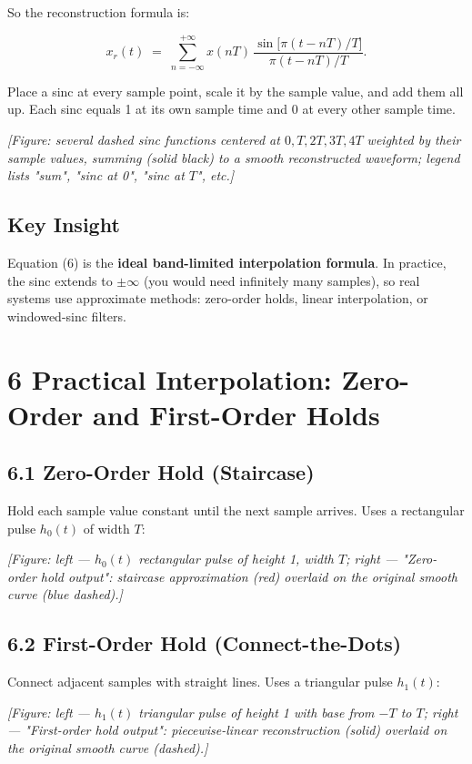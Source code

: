 \documentclass[11pt]{article}
\begin{document}
So the reconstruction formula is:

\[\boxed{\,x_r(t) \;=\; \sum_{n=-\infty}^{+\infty} x(nT)\,\frac{\sin\!\big[\pi(t-nT)/T\big]}{\pi(t-nT)/T}.\,} \tag{6}\]

Place a sinc at every sample point, scale it by the sample value, and add them all up. Each sinc equals 1 at its own sample time and 0 at every other sample time.

\textit{[Figure: several dashed sinc functions centered at $0, T, 2T, 3T, 4T$ weighted by their sample values, summing (solid black) to a smooth reconstructed waveform; legend lists "sum", "sinc at 0", "sinc at $T$", etc.]}

\subsection*{Key Insight}

Equation (6) is the \textbf{ideal band-limited interpolation formula}. In practice, the sinc extends to $\pm\infty$ (you would need infinitely many samples), so real systems use approximate methods: zero-order holds, linear interpolation, or windowed-sinc filters.

\section*{6 Practical Interpolation: Zero-Order and First-Order Holds}

\subsection*{6.1 Zero-Order Hold (Staircase)}

Hold each sample value constant until the next sample arrives. Uses a rectangular pulse $h_0(t)$ of width $T$:

\textit{[Figure: left — $h_0(t)$ rectangular pulse of height 1, width $T$; right — "Zero-order hold output": staircase approximation (red) overlaid on the original smooth curve (blue dashed).]}

\subsection*{6.2 First-Order Hold (Connect-the-Dots)}

Connect adjacent samples with straight lines. Uses a triangular pulse $h_1(t)$:

\textit{[Figure: left — $h_1(t)$ triangular pulse of height 1 with base from $-T$ to $T$; right — "First-order hold output": piecewise-linear reconstruction (solid) overlaid on the original smooth curve (dashed).]}
\end{document}
